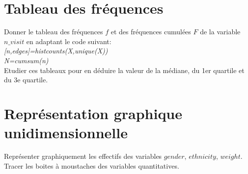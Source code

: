 \documentclass[11pt]{exam}
\begin{document}
\section{Tableau des fr\'equences} 
Donner le tableau des fr\'equences $f$ et des fr\'equences cumul\'ees $F$ de la variable $n\_visit$ en adaptant le code suivant:\\
\textit{[n,edges]=histcounts(X,unique(X))\\
N=cumsum(n)}
\\
Etudier ces tableaux pour en d\'eduire la valeur de la m\'ediane, du 1er quartile et du 3e quartile.
\section{Repr\'esentation graphique unidimensionnelle}
Repr\'esenter graphiquement les effectifs des variables $gender$, $ethnicity$, $weight$.\\
Tracer les boites à moustaches des variables quantitatives.
\end{document}
